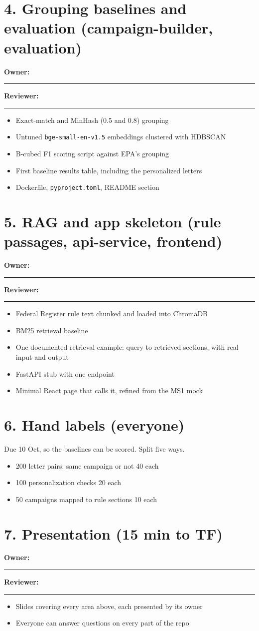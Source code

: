 \documentclass[10pt]{article}
\newcommand{\owner}{\textbf{Owner:} \rule{4cm}{0.4pt}\quad \textbf{Reviewer:} \rule{4cm}{0.4pt}}
\begin{document}
\section{4. Grouping baselines and evaluation (campaign-builder, evaluation)}
\owner
\begin{itemize}
  \item Exact-match and MinHash (0.5 and 0.8) grouping
  \item Untuned \texttt{bge-small-en-v1.5} embeddings clustered with HDBSCAN
  \item B-cubed F1 scoring script against EPA's grouping
  \item First baseline results table, including the personalized letters
  \item Dockerfile, \texttt{pyproject.toml}, README section
\end{itemize}

\section{5. RAG and app skeleton (rule passages, api-service, frontend)}
\owner
\begin{itemize}
  \item Federal Register rule text chunked and loaded into ChromaDB
  \item BM25 retrieval baseline
  \item One documented retrieval example: query to retrieved sections, with real input and output
  \item FastAPI stub with one endpoint
  \item Minimal React page that calls it, refined from the MS1 mock
\end{itemize}

\section{6. Hand labels (everyone)}
Due 10 Oct, so the baselines can be scored. Split five ways.
\begin{itemize}
  \item 200 letter pairs: same campaign or not \hfill 40 each
  \item 100 personalization checks \hfill 20 each
  \item 50 campaigns mapped to rule sections \hfill 10 each
\end{itemize}

\section{7. Presentation (15 min to TF)}
\owner
\begin{itemize}
  \item Slides covering every area above, each presented by its owner
  \item Everyone can answer questions on every part of the repo
\end{itemize}
\end{document}
